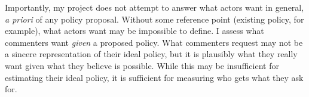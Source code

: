 

Importantly, my project does not attempt to answer what actors want in general, \textit{a priori} of any policy proposal. Without some reference point (existing policy, for example), what actors want may be impossible to define. I assess what commenters want \textit{given} a proposed policy. What commenters request may not be a sincere representation of their ideal policy, but it is plausibly what they really want given what they believe is possible. While this may be insufficient for estimating their ideal policy, it is sufficient for measuring who gets what they ask for. 

